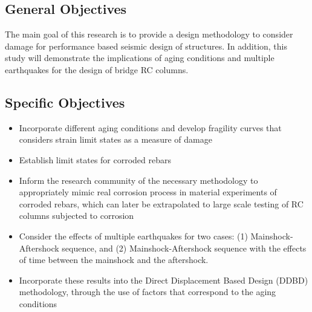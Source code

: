 \subsection{General Objectives}
The main goal of this research is to provide a design methodology to consider damage for performance based seismic design of structures. In addition, this study will demonstrate the implications of aging conditions and multiple earthquakes for the design of bridge RC columns.

\subsection{Specific Objectives}
\begin{itemize}
	\item Incorporate different aging conditions and develop fragility curves that considers strain limit states as a measure of damage
	\item Establish limit states for corroded rebars
	\item Inform the research community of the necessary methodology to appropriately mimic real corrosion process in material experiments of corroded rebars, which can later be extrapolated to large scale testing of RC columns subjected to corrosion
	\item Consider the effects of multiple earthquakes for  two cases: (1) Mainshock-Aftershock sequence, and (2) Mainshock-Aftershock sequence with the effects of time between the mainshock and the aftershock.
	\item Incorporate these results into the Direct Displacement Based Design (DDBD) methodology, through the use of factors that correspond to the aging conditions
\end{itemize}